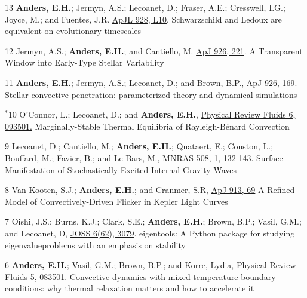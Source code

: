 \cvpub{}
	  {13}
	  {
		\textbf{Anders, E.H.}; Jermyn, A.S.; Lecoanet, D.; Fraser, A.E.; Cresswell, I.G.; Joyce, M.; and Fuentes, J.R. 
        \href{https://iopscience.iop.org/article/10.3847/2041-8213/ac5cb5}{ApJL 928, L10}.
	  }
	  {Schwarzschild and Ledoux are equivalent on evolutionary timescales}

\cvpub{}
	  {12}
	  {
		Jermyn, A.S.; \textbf{Anders, E.H.}; and Cantiello, M. 
        \href{https://iopscience.iop.org/article/10.3847/1538-4357/ac4e89}{ApJ 926, 221}.
	  }
	  {A Transparent Window into Early-Type Stellar Variability}

\cvpub{}
	  {11}
	  {
		\textbf{Anders, E.H.}; Jermyn, A.S.; Lecoanet, D.; and Brown, B.P., 
        \href{https://iopscience.iop.org/article/10.3847/1538-4357/ac408d}{ApJ 926, 169}.
	  }
	  {Stellar convective penetration: parameterized theory and dynamical simulations}

	  {$^*$10}
	  {
		O'Connor, L.; Lecoanet, D.; and \textbf{Anders, E.H.}, 
		  \href{https://journals.aps.org/prfluids/abstract/10.1103/PhysRevFluids.6.093501}{Physical Review Fluids 6, 093501.}
	  }
	  {Marginally-Stable Thermal Equilibria of Rayleigh-B\'{e}nard Convection}

\cvpub{}
	  {9}
	  {
		Lecoanet, D.; Cantiello, M.; \textbf{Anders, E.H.}; Quataert, E.; Couston, L.; Bouffard, M.; Favier, B.; and Le Bars, M.,
          \href{https://doi.org/10.1093/mnras/stab2524}{MNRAS 508, 1, 132-143.}
	  }
	  {Surface Manifestation of Stochastically Excited Internal Gravity Waves}

\cvpub{}
	  {8}
	  {
		 Van Kooten, S.J.; \textbf{Anders, E.H.}; and Cranmer, S.R,
		  \href{https://iopscience.iop.org/article/10.3847/1538-4357/abf7bf}{ApJ 913, 69}
	  }
	  {A Refined Model of Convectively-Driven Flicker in Kepler Light Curves}

\cvpub{}
	  {7}
	  {
		Oishi, J.S.; Burns, K.J.; Clark, S.E.; \textbf{Anders, E.H.}; Brown, B.P.; Vasil, G.M.; and Lecoanet, D,
		  \href{https://joss.theoj.org/papers/10.21105/joss.03079}{JOSS 6(62), 3079}.
	  }
	  {eigentools: A Python package for studying eigenvalueproblems with an emphasis on stability}

	  {6}
	  {
		  \textbf{Anders, E.H.}; Vasil, G.M.; Brown, B.P.; and Korre, Lydia, 
		  \href{https://journals.aps.org/prfluids/abstract/10.1103/PhysRevFluids.5.083501}{Physical Review Fluids 5, 083501.}
	  }
	  {Convective dynamics with mixed temperature boundary conditions: why thermal relaxation matters and how to accelerate it}

